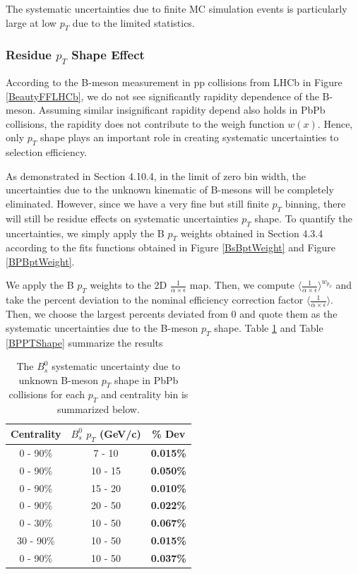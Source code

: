 The systematic uncertainties due to finite MC simulation events is particularly large at low $p_T$ due to the limited statistics. 
 

\subsubsection{Residue $p_T$ Shape Effect}

According to the B-meson measurement in pp collisions from LHCb in Figure \ref{BeautyFFLHCb}, we do not see significantly rapidity dependence of the B-meson. Assuming similar insignificant rapidity depend also holds in PbPb collisions, the rapidity does not contribute to the weigh function $w(x)$. Hence, only $p_T$ shape plays an important role in creating systematic uncertainties to selection efficiency. 

As demonstrated in Section 4.10.4, in the limit of zero bin width, the uncertainties due to the unknown kinematic of B-mesons will be completely eliminated. However, since we have a very fine but still finite $p_T$ binning, there will still be residue effects on systematic uncertainties $p_T$ shape. To quantify the uncertainties, we simply apply the B $p_T$ weights obtained in Section 4.3.4 according to the fits functions obtained in Figure \ref{BsBptWeight} and Figure \ref{BPBptWeight}. 

We apply the B $p_T$ weights to the 2D $\frac{1}{\alpha \times \epsilon}$ map. Then, we compute $\langle\frac{1}{\alpha \times \epsilon}\rangle^{w_{p_T}}$ and take the percent deviation to the nominal efficiency correction factor $\langle\frac{1}{\alpha \times \epsilon}\rangle$. Then, we choose the largest percents deviated from 0 and quote them as the systematic uncertainties due to the B-meson $p_T$ shape. Table \ref{BsPTShape} and Table \ref{BPPTShape} summarize the results 


\begin{table}[h]
\begin{center}
\caption{The $B^0_s$ systematic uncertainty due to unknown B-meson $p_T$ shape in PbPb collisions for each $p_T$ and centrality bin is summarized below.}
\vspace{1em}
\label{BsPTShape}
  \begin{tabular}{| c | c |c |}
    \hline
     Centrality & $B^0_s$ $p_T$ (GeV/c) & \% Dev \\
    \hline
    \hline
0 - 90\% & 7 - 10 &   \textbf{0.015\% }     \\ 
0 - 90\% & 10 - 15 & \textbf{0.050\% }    \\ 
0 - 90\% & 15 - 20 &  \textbf{0.010\% }     \\ 
0 - 90\% & 20 - 50 &  \textbf{0.022\% }    \\ 
0 - 30\% & 10 - 50 &   \textbf{0.067\% }  \\ 
30 - 90\% & 10 - 50 & \textbf{0.015\% }    \\ 
0 - 90\% & 10 - 50 &  \textbf{0.037\% }   \\ 
    \hline
    \hline
\end{tabular}
\end{center}
\end{table}



